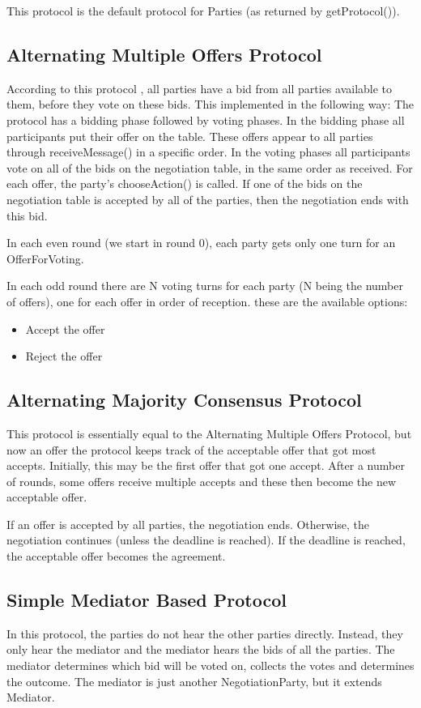 \documentclass[]{article}
\begin{document}
This protocol is the default protocol for Parties (as returned by getProtocol()).


\subsection{Alternating Multiple Offers Protocol}
According to this protocol \cite{MultilateralOffersProtocols}, all parties have a bid from all parties available to them, before they vote on these bids. This implemented in the following way: The protocol has a bidding phase followed by voting phases. In the bidding phase all participants put their offer on the table. These offers appear to all parties through receiveMessage() in a specific order. In the voting phases all participants vote on all of the bids on the negotiation table, in the same order as received. For each offer, the party's chooseAction() is called. If one of the bids on the negotiation table is accepted by all of the parties, then the negotiation ends with this bid. 

In each even round (we start in round 0), each party gets only one turn for an OfferForVoting. 

In each odd round there are N voting turns for each party (N being the number of offers), one for each offer in order of reception. these are the available options:
\begin{itemize}
\item Accept the offer
\item Reject the offer
\end{itemize}


\subsection{Alternating Majority Consensus Protocol}

This protocol is essentially equal to the Alternating Multiple Offers Protocol, but now an offer the protocol keeps track of the acceptable offer that got most accepts.
Initially, this may be the first offer that got one accept. After a number of rounds, some offers receive multiple accepts and these then become the new acceptable offer.

If an offer is accepted by all parties, the negotiation ends. Otherwise, the negotiation continues (unless the deadline is reached). If the deadline is reached, the acceptable offer becomes the agreement.
 
 
\subsection{Simple Mediator Based Protocol}
In this protocol, the parties do not hear the other parties directly. Instead, they only hear the mediator and the mediator hears the bids of all the parties. The mediator determines which bid will be voted on, collects the votes and determines the outcome. The mediator is just another NegotiationParty, but it extends Mediator.
\end{document}
